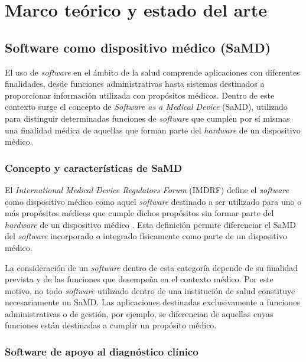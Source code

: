 \chapter{Marco teórico y estado del arte}
\label{chap:marco-teorico}

\section{Software como dispositivo médico (SaMD)}
\label{sec:samd}

El uso de \textit{software} en el ámbito de la salud comprende aplicaciones
con diferentes finalidades, desde funciones administrativas hasta sistemas
destinados a proporcionar información utilizada con propósitos médicos.
Dentro de este contexto surge el concepto de \textit{Software as a Medical
Device} (SaMD), utilizado para distinguir determinadas funciones de
\textit{software} que cumplen por sí mismas una finalidad médica de aquellas
que forman parte del \textit{hardware} de un dispositivo médico.

\subsection{Concepto y características de SaMD}
\label{subsec:concepto-samd}

El \textit{International Medical Device Regulators Forum} (IMDRF) define el
\textit{software} como dispositivo médico como aquel \textit{software}
destinado a ser utilizado para uno o más propósitos médicos que cumple
dichos propósitos sin formar parte del \textit{hardware} de un dispositivo
médico \citep{IMDRF2013SaMD}. Esta definición permite diferenciar el SaMD
del \textit{software} incorporado o integrado físicamente como parte de un
dispositivo médico.

La consideración de un \textit{software} dentro de esta categoría depende
de su finalidad prevista y de las funciones que desempeña en el contexto
médico. Por este motivo, no todo \textit{software} utilizado dentro de una
institución de salud constituye necesariamente un SaMD. Las aplicaciones
destinadas exclusivamente a funciones administrativas o de gestión, por
ejemplo, se diferencian de aquellas cuyas funciones están destinadas a
cumplir un propósito médico.

\subsection{Software de apoyo al diagnóstico clínico}
\label{subsec:software-apoyo-diagnostico}

